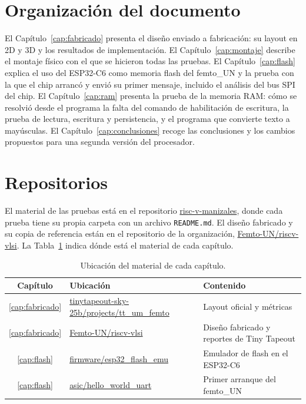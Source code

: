 \documentclass[11pt,letterpaper,oneside]{report}
\newcommand{\code}[1]{\texttt{#1}}
\newcommand{\repo}{https://github.com/SebastianRodriguez05/risc-v-manizales/tree/main}
\begin{document}
\section{Organización del documento}

El Capítulo~\ref{cap:fabricado} presenta el diseño enviado a fabricación: su layout en 2D y 3D y los resultados de implementación. El Capítulo~\ref{cap:montaje} describe el montaje físico con el que se hicieron todas las pruebas. El Capítulo~\ref{cap:flash} explica el uso del ESP32-C6 como memoria flash del femto\_UN y la prueba con la que el chip arrancó y envió su primer mensaje, incluido el análisis del bus SPI del chip. El Capítulo~\ref{cap:ram} presenta la prueba de la memoria RAM: cómo se resolvió desde el programa la falta del comando de habilitación de escritura, la prueba de lectura, escritura y persistencia, y el programa que convierte texto a mayúsculas. El Capítulo~\ref{cap:conclusiones} recoge las conclusiones y los cambios propuestos para una segunda versión del procesador.

\section{Repositorios}

El material de las pruebas está en el repositorio \href{https://github.com/SebastianRodriguez05/risc-v-manizales}{risc-v-manizales}, donde cada prueba tiene su propia carpeta con un archivo \code{README.md}. El diseño fabricado y su copia de referencia están en el repositorio de la organización, \href{https://github.com/Femto-UN/riscv-vlsi}{Femto-UN/riscv-vlsi}. La Tabla~\ref{tab:repos} indica dónde está el material de cada capítulo.

\begin{table}[htbp]
\centering
\caption{Ubicación del material de cada capítulo.}
\label{tab:repos}
\begin{tabular}{c >{\raggedright\arraybackslash}p{6.4cm} >{\raggedright\arraybackslash}p{6.4cm}}
\toprule
\textbf{Capítulo} & \textbf{Ubicación} & \textbf{Contenido} \\
\midrule
\ref{cap:fabricado} & \href{https://github.com/TinyTapeout/tinytapeout-sky-25b/tree/main/projects/tt_um_femto}{tinytapeout-sky-25b/projects/tt\_um\_femto} & Layout oficial y métricas \\
\ref{cap:fabricado} & \href{https://github.com/Femto-UN/riscv-vlsi}{Femto-UN/riscv-vlsi} & Diseño fabricado y reportes de Tiny Tapeout \\
\ref{cap:flash} & \href{\repo/firmware/esp32_flash_emu}{firmware/esp32\_flash\_emu} & Emulador de flash en el ESP32-C6 \\
\ref{cap:flash} & \href{\repo/asic/hello_world_uart}{asic/hello\_world\_uart} & Primer arranque del femto\_UN \\
\bottomrule
\end{tabular}
\end{table}
\end{document}
